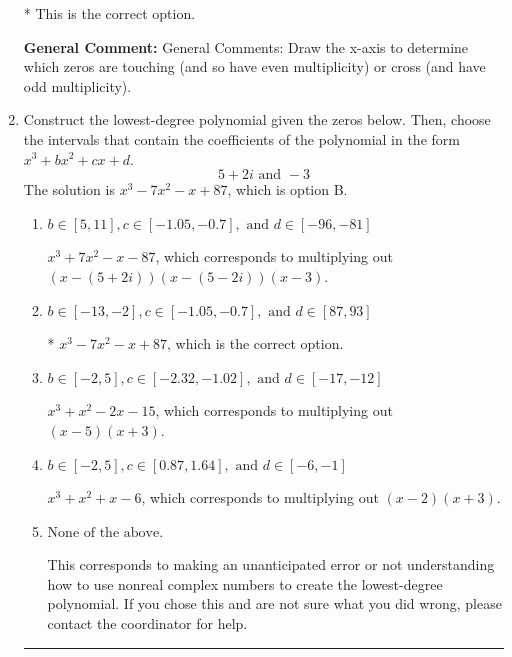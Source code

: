 \documentclass{extbook}[14pt]
\newcommand{\litem}[1]{\item #1

\rule{\textwidth}{0.4pt}}
\begin{document}
\begin{enumerate}
{\begin{enumerate}[label=\Alph*.]
* This is the correct option.
\end{enumerate}

\textbf{General Comment:} General Comments: Draw the x-axis to determine which zeros are touching (and so have even multiplicity) or cross (and have odd multiplicity).
}
\litem{
Construct the lowest-degree polynomial given the zeros below. Then, choose the intervals that contain the coefficients of the polynomial in the form $x^3+bx^2+cx+d$.
\[ 5 + 2 i \text{ and } -3 \]The solution is \( x^{3} -7 x^{2} -x + 87 \), which is option B.\begin{enumerate}[label=\Alph*.]
\item \( b \in [5, 11], c \in [-1.05, -0.7], \text{ and } d \in [-96, -81] \)

$x^{3} +7 x^{2} -x -87$, which corresponds to multiplying out $(x-(5 + 2 i))(x-(5 - 2 i))(x -3)$.
\item \( b \in [-13, -2], c \in [-1.05, -0.7], \text{ and } d \in [87, 93] \)

* $x^{3} -7 x^{2} -x + 87$, which is the correct option.
\item \( b \in [-2, 5], c \in [-2.32, -1.02], \text{ and } d \in [-17, -12] \)

$x^{3} + x^{2} -2 x -15$, which corresponds to multiplying out $(x -5)(x + 3)$.
\item \( b \in [-2, 5], c \in [0.87, 1.64], \text{ and } d \in [-6, -1] \)

$x^{3} + x^{2} +x -6$, which corresponds to multiplying out $(x -2)(x + 3)$.
\item \( \text{None of the above.} \)

This corresponds to making an unanticipated error or not understanding how to use nonreal complex numbers to create the lowest-degree polynomial. If you chose this and are not sure what you did wrong, please contact the coordinator for help.
\end{enumerate}

}
\end{enumerate}
\end{document}
